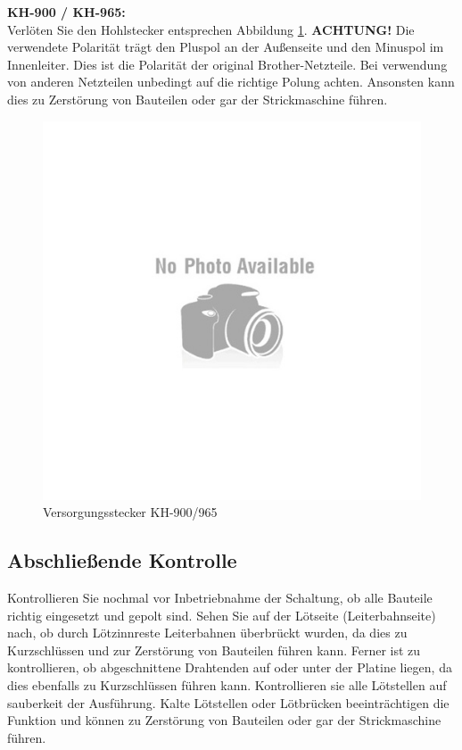 \documentclass[fleqn,10pt]{SelfArx} %
\begin{document}
\FloatBarrier

\textbf{KH-900 / KH-965:} \\

Verlöten Sie den Hohlstecker entsprechen Abbildung \ref{fig:abb8_3}. \textbf{ACHTUNG!} Die verwendete Polarität trägt den Pluspol an der Außenseite und den Minuspol im Innenleiter. Dies ist die Polarität der original Brother-Netzteile. Bei verwendung von anderen Netzteilen unbedingt auf die richtige Polung achten. Ansonsten kann dies zu Zerstörung von Bauteilen oder gar der Strickmaschine führen.

\begin{figure}[tbhp]\centering
\includegraphics[width=\linewidth]{no}
\caption{Versorgungsstecker KH-900/965}
\label{fig:abb8_3}
\end{figure}

\FloatBarrier

 \subsection*{Abschließende Kontrolle}

Kontrollieren Sie nochmal vor Inbetriebnahme der Schaltung, ob alle Bauteile richtig eingesetzt und gepolt sind. Sehen Sie auf der Lötseite (Leiterbahnseite) nach, ob durch Lötzinnreste Leiterbahnen überbrückt wurden, da dies zu Kurzschlüssen und zur Zerstörung von Bauteilen führen kann. Ferner ist zu kontrollieren, ob abgeschnittene Drahtenden auf oder unter der Platine liegen, da dies ebenfalls zu Kurzschlüssen führen kann.
Kontrollieren sie alle Lötstellen auf sauberkeit der Ausführung. Kalte Lötstellen oder Lötbrücken beeinträchtigen die Funktion und können zu Zerstörung von Bauteilen oder gar der Strickmaschine führen.
\end{document}
